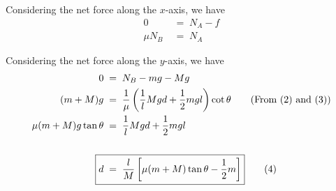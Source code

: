 \documentclass[11pt,reqno]{article}
\begin{document}
Considering the net force along the $x$-axis, we have
\begin{align*}
	0					\;&=\;	N_A - f								\\
	\mu N_B				\;&=\;	N_A									\tag{3}
\end{align*}

Considering the net force along the $y$-axis, we have
\begin{align*}
	0					\;&=\;	N_B - mg - Mg						\\
	(m + M)g			\;&=\;	\frac{1}{\mu}\left(\frac{1}{l}Mgd + \frac{1}{2}mgl\right)\cot\theta	\tag{From (2) and (3)}				\\
	\mu(m + M)g\tan\theta	\;&=\;	\frac{1}{l}Mgd + \frac{1}{2}mgl							\\\\
	\Aboxed{d					\;&=\;	\frac{l}{M}\left[\mu(m + M)\tan\theta - \frac{1}{2}m \right]		}		\tag{4}
\end{align*}
\end{document}
